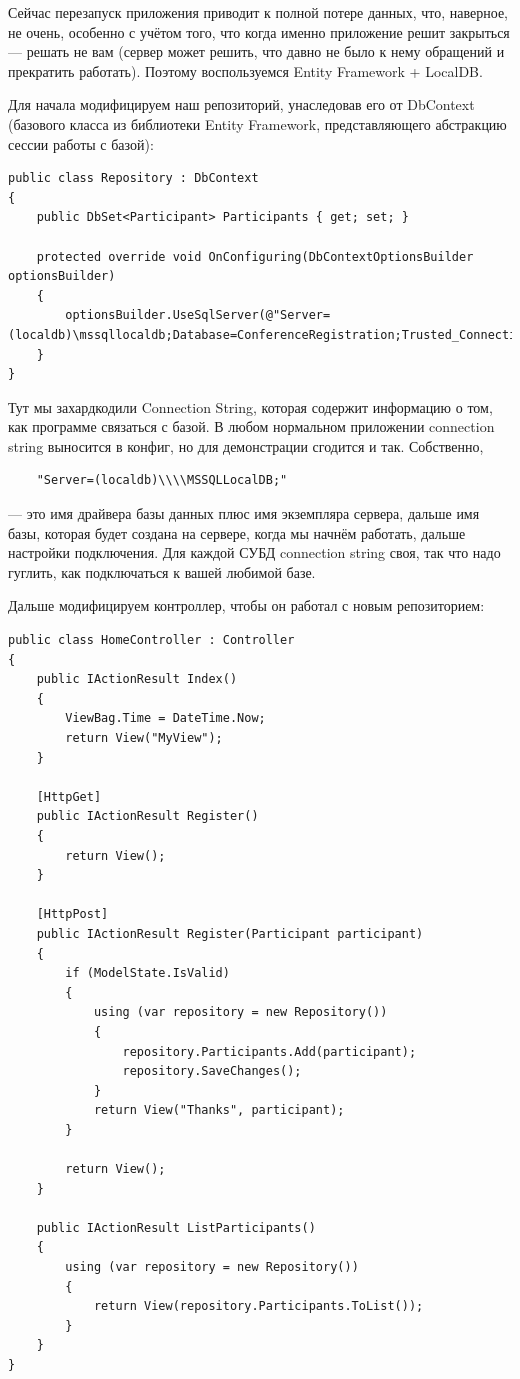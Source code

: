 \documentclass[a5paper]{article}
\begin{document}
Сейчас перезапуск приложения приводит к полной потере данных, что, наверное, не очень, особенно с учётом того, что когда именно приложение решит закрыться --- решать не вам (сервер может решить, что давно не было к нему обращений и прекратить работать). Поэтому воспользуемся
Entity Framework + LocalDB.

Для начала модифицируем наш репозиторий, унаследовав его от DbContext (базового класса из библиотеки Entity Framework, представляющего абстракцию сессии работы с базой):

\begin{scriptsize}
	\begin{verbatim}
public class Repository : DbContext
{
    public DbSet<Participant> Participants { get; set; }

    protected override void OnConfiguring(DbContextOptionsBuilder optionsBuilder)
    {
        optionsBuilder.UseSqlServer(@"Server=(localdb)\mssqllocaldb;Database=ConferenceRegistration;Trusted_Connection=True;");
    }
}
	\end{verbatim}
\end{scriptsize}

Тут мы захардкодили Connection String, которая содержит информацию о том, как программе связаться с базой. В любом нормальном приложении connection string выносится в конфиг, но для демонстрации сгодится и так. Собственно, 
\begin{verbatim}
	"Server=(localdb)\\\\MSSQLLocalDB;"
\end{verbatim} 
--- это имя драйвера базы данных плюс имя экземпляра сервера, дальше имя базы, которая будет создана на сервере, когда мы начнём работать, дальше настройки подключения. Для каждой СУБД connection string своя, так что надо гуглить, как подключаться к вашей любимой базе.

Дальше модифицируем контроллер, чтобы он работал с новым репозиторием:

\begin{verbatim}
public class HomeController : Controller
{
    public IActionResult Index()
    {
        ViewBag.Time = DateTime.Now;
        return View("MyView");
    }

    [HttpGet]
    public IActionResult Register()
    {
        return View();
    }

    [HttpPost]
    public IActionResult Register(Participant participant)
    {
        if (ModelState.IsValid)
        {
            using (var repository = new Repository())
            {
                repository.Participants.Add(participant);
                repository.SaveChanges();
            }
            return View("Thanks", participant);
        }

        return View();
    }

    public IActionResult ListParticipants()
    {
        using (var repository = new Repository())
        {
            return View(repository.Participants.ToList());
        }
    }
}
\end{verbatim}
\end{document}
